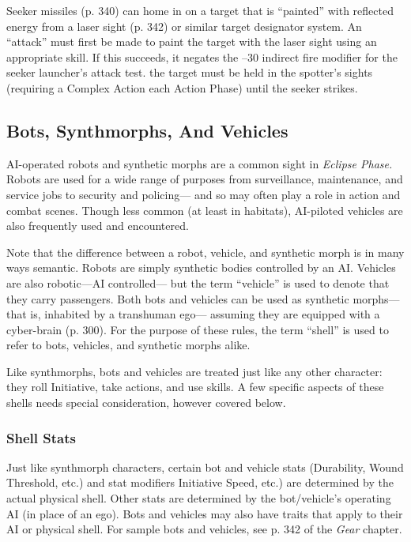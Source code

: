 Seeker missiles (p. 340) can home in on 
a target that is ``painted'' with reflected 
energy from a laser sight (p. 342) or similar
target designator system. An ``attack''
must first be made to paint the target 
with the laser sight using an appropriate
skill. If this succeeds, it negates the
–30 indirect fire  modifier for the seeker 
launcher's attack test. the target must be 
held in the spotter's sights (requiring a 
Complex Action each Action Phase) until 
the seeker strikes.

\subsection{Bots, Synthmorphs, And Vehicles}

AI-operated robots and synthetic morphs 
are a common sight in \textit{Eclipse Phase.}
Robots are used for a wide range of purposes
from surveillance, maintenance,
and service jobs to security and policing—
and so may often play a role in action and 
combat scenes. Though less common (at 
least in habitats), AI-piloted vehicles are 
also frequently used and encountered.

Note that the difference between a 
robot, vehicle, and synthetic morph is in 
many ways semantic. Robots are simply 
synthetic bodies controlled by an AI. 
Vehicles are also robotic—AI controlled—
but the term ``vehicle'' is used to denote 
that they carry passengers. Both bots and 
vehicles can be used as synthetic morphs—
that is, inhabited by a transhuman ego—
assuming they are equipped with a cyber-brain
(p. 300). For the purpose of these
rules, the term ``shell'' is used to refer to 
bots, vehicles, and synthetic morphs alike.

Like synthmorphs, bots and vehicles 
are treated just like any other character: 
they roll Initiative, take actions, and use 
skills. A few specific aspects of these 
shells needs special consideration, however
covered below.

\subsubsection{Shell Stats}

Just like synthmorph characters, certain 
bot and vehicle stats (Durability, Wound 
Threshold, etc.) and stat modifiers Initiative
Speed, etc.) are determined by
the actual physical shell. Other stats are 
determined by the bot/vehicle's operating 
AI (in place of an ego). Bots and vehicles 
may also have traits that apply to their 
AI or physical shell. For sample bots and 
vehicles, see p. 342 of the \textit{Gear} chapter.

